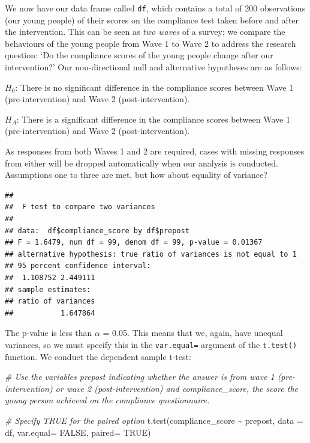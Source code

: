 \documentclass[
]{book}
\newenvironment{Shaded}{\begin{snugshade}}{\end{snugshade}}
\newcommand{\AttributeTok}[1]{\textcolor[rgb]{0.77,0.63,0.00}{#1}}
\newcommand{\CommentTok}[1]{\textcolor[rgb]{0.56,0.35,0.01}{\textit{#1}}}
\newcommand{\ConstantTok}[1]{\textcolor[rgb]{0.00,0.00,0.00}{#1}}
\newcommand{\FunctionTok}[1]{\textcolor[rgb]{0.00,0.00,0.00}{#1}}
\newcommand{\NormalTok}[1]{#1}
\newcommand{\SpecialCharTok}[1]{\textcolor[rgb]{0.00,0.00,0.00}{#1}}
\begin{document}
We now have our data frame called \texttt{df}, which contains a total of 200 observations (our young people) of their scores on the compliance test taken before and after the intervention. This can be seen as \emph{two waves} of a survey; we compare the behaviours of the young people from Wave 1 to Wave 2 to address the research question: `Do the compliance scores of the young people change after our intervention?' Our non-directional null and alternative hypotheses are as follows:

\(H_0\): There is no significant difference in the compliance scores between Wave 1 (pre-intervention) and Wave 2 (post-intervention).

\(H_A\): There is a significant difference in the compliance scores between Wave 1 (pre-intervention) and Wave 2 (post-intervention).

As responses from both Waves 1 and 2 are required, cases with missing responses from either will be dropped automatically when our analysis is conducted. Assumptions one to three are met, but how about equality of variance?

\begin{Shaded}
\end{Shaded}

\begin{verbatim}
## 
##  F test to compare two variances
## 
## data:  df$compliance_score by df$prepost
## F = 1.6479, num df = 99, denom df = 99, p-value = 0.01367
## alternative hypothesis: true ratio of variances is not equal to 1
## 95 percent confidence interval:
##  1.108752 2.449111
## sample estimates:
## ratio of variances 
##           1.647864
\end{verbatim}

The p-value is less than \(\alpha\) = 0.05. This means that we, again, have unequal variances, so we must specify this in the \texttt{var.equal=} argument of the \texttt{t.test()} function. We conduct the dependent sample t-test:

\begin{Shaded}
\begin{Highlighting}[]
\CommentTok{\# Use the variables \textasciigrave{}prepost\textasciigrave{} indicating whether the answer is from wave 1 (pre{-}intervention) or wave 2 (post{-}intervention) and \textasciigrave{}compliance\_score\textasciigrave{}, the score the young person achieved on the compliance questionnaire. }

\CommentTok{\# Specify TRUE for the \textasciigrave{}paired\textasciigrave{} option }
\FunctionTok{t.test}\NormalTok{(compliance\_score }\SpecialCharTok{\textasciitilde{}}\NormalTok{ prepost, }\AttributeTok{data =}\NormalTok{ df, }\AttributeTok{var.equal=} \ConstantTok{FALSE}\NormalTok{, }\AttributeTok{paired=} \ConstantTok{TRUE}\NormalTok{)}
\end{Highlighting}
\end{Shaded}
\end{document}
